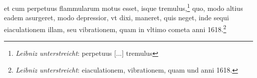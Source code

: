 \pend \pstart [p.~181] [...] et cum perpetuus flammularum motus esset, isque tremulus,\footnote{\textit{Leibniz unterstreicht}: perpetuus [...] tremulus} quo,  modo altius eadem asurgeret, modo depressior, vt dixi,  maneret, quis neget, inde sequi eiaculationem illam,  seu vibrationem, quam in vltimo cometa\protect{} anni 1618.\footnote{\textit{Leibniz unterstreicht}: eiaculationem, vibrationem, quam und anni 1618.}